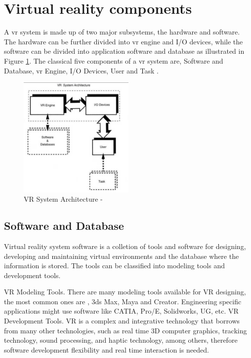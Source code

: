 

\section{Virtual reality components}



A \acrshort{vr} system is made up of two major subsystems, the hardware and software. The hardware can be further divided into \acrshort{vr} engine and I/O devices, while the software can be divided into application software and database as illustrated in Figure \ref{fig:sys}.
The classical five components of a \acrshort{vr} system are, Software and Database, \acrshort{vr} Engine, I/O Devices, User and Task \citep{burdea2017virtual,Bamodu2013VirtualComponents}.

\begin{figure}[ht]
    \centering
    \includegraphics[width=0.50\textwidth]{images/VR.png}
    \caption{VR System Architecture - \citep{burdea2017virtual}}
    \label{fig:sys}
\end{figure}


\subsection{Software and Database}
Virtual reality system software is a colletion of tools and software for designing, developing and
maintaining virtual environments and the database where the information is stored. The tools can be classified into modeling tools and development tools.

VR Modeling Tools. There are many modeling tools available for VR designing, the most
common ones are , 3ds Max, Maya and Creator. Engineering specific applications might use software like CATIA, Pro/E, Solidworks, UG, etc. VR Development Tools. VR is a complex and integrative technology that borrows from many other technologies, such as real time 3D computer graphics, tracking technology, sound processing, and haptic technology, among others, therefore software development flexibility and real time interaction is needed.



